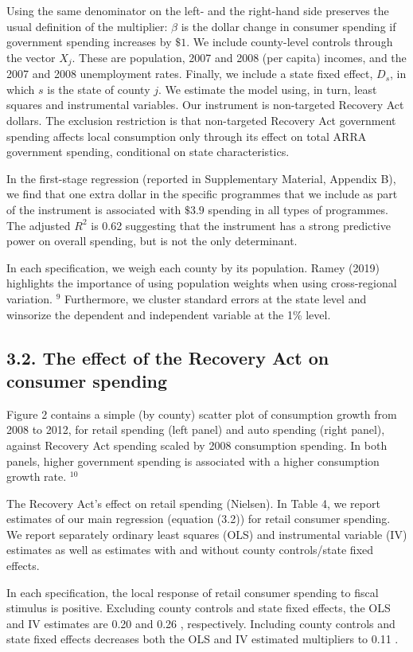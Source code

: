 \documentclass[10pt]{article}
\begin{document}
Using the same denominator on the left- and the right-hand side preserves the usual definition of the multiplier: $\beta$ is the dollar change in consumer spending if government spending increases by $\$ 1$. We include county-level controls through the vector $X_{j}$. These are population, 2007 and 2008 (per capita) incomes, and the 2007 and 2008 unemployment rates. Finally, we include a state fixed effect, $D_{s}$, in which $s$ is the state of county $j$. We estimate the model using, in turn, least squares and instrumental variables. Our instrument is non-targeted Recovery Act dollars. The exclusion restriction is that non-targeted Recovery Act government spending affects local consumption only through its effect on total ARRA government spending, conditional on state characteristics.

In the first-stage regression (reported in Supplementary Material, Appendix B), we find that one extra dollar in the specific programmes that we include as part of the instrument is associated with $\$ 3.9$ spending in all types of programmes. The adjusted $R^{2}$ is 0.62 suggesting that the instrument has a strong predictive power on overall spending, but is not the only determinant.

In each specification, we weigh each county by its population. Ramey (2019) highlights the importance of using population weights when using cross-regional variation. ${ }^{9}$ Furthermore, we cluster standard errors at the state level and winsorize the dependent and independent variable at the 1\% level.

\subsection*{3.2. The effect of the Recovery Act on consumer spending}
Figure 2 contains a simple (by county) scatter plot of consumption growth from 2008 to 2012, for retail spending (left panel) and auto spending (right panel), against Recovery Act spending scaled by 2008 consumption spending. In both panels, higher government spending is associated with a higher consumption growth rate. ${ }^{10}$

The Recovery Act's effect on retail spending (Nielsen). In Table 4, we report estimates of our main regression (equation (3.2)) for retail consumer spending. We report separately ordinary least squares (OLS) and instrumental variable (IV) estimates as well as estimates with and without county controls/state fixed effects.

In each specification, the local response of retail consumer spending to fiscal stimulus is positive. Excluding county controls and state fixed effects, the OLS and IV estimates are 0.20 and 0.26 , respectively. Including county controls and state fixed effects decreases both the OLS and IV estimated multipliers to 0.11 .
\end{document}
